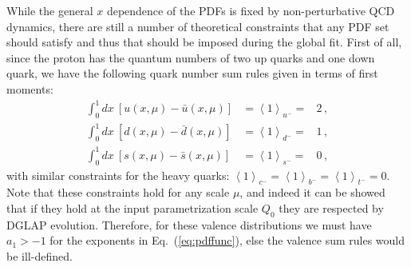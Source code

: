 While the general $x$ dependence of the PDFs is fixed by
non-perturbative QCD dynamics, there are still a number
of theoretical constraints that any PDF set should satisfy and thus that
should be imposed during the global fit.
%
First of all, since
the proton has the quantum numbers of two up quarks and one down quark,
we have the following quark number sum rules given in terms of first
moments: 
%
\begin{eqnarray}
\int_{0}^{1}dx\ \left[u(x,\mu)-\bar{u}(x,\mu)\right] & =\left\langle 1\right\rangle _{u^{-}}= & 2 \, ,\nonumber \\
\int_{0}^{1}dx\ \left[d(x,\mu)-\bar{d}(x,\mu)\right] & =\left\langle 1\right\rangle _{d^{-}}= & 1 \, ,\\
\int_{0}^{1}dx\ \left[s(x,\mu)-\bar{s}(x,\mu)\right] & =\left\langle 1\right\rangle _{s^{-}}= & 0 \, \nonumber ,
\end{eqnarray}
with similar constraints for the heavy quarks: $\left\langle 1\right\rangle _{c^{-}}=\left\langle 1\right\rangle _{b^{-}}=\left\langle 1\right\rangle _{t^{-}}=0$.
%
Note that these constraints hold for any scale $\mu$, and indeed it can be showed
that if they hold at the input parametrization scale $Q_0$ they
are respected by DGLAP evolution.
%
Therefore, for these valence distributions we must have $a_1>-1$ for the exponents in
Eq.~(\ref{eq:pdffunc}), else the valence sum rules would be ill-defined.

